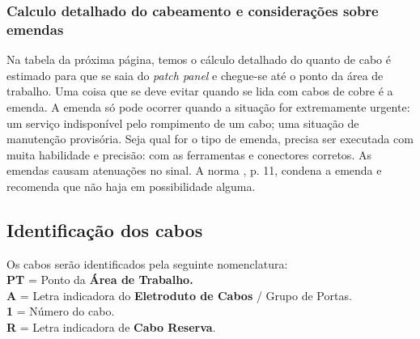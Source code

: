 \documentclass[	DIV=calc,%
							paper=a4,%
							fontsize=12pt,%
							onecolumn]{scrartcl}	 					%
\begin{document}




\subsubsection{Calculo detalhado do cabeamento e considerações sobre emendas}

Na tabela da próxima página, temos o cálculo detalhado do quanto de cabo é estimado para que se saia do \textit{patch panel} e chegue-se até o ponto da área de trabalho. Uma coisa que se deve evitar quando se lida com cabos de cobre é a emenda. A emenda só pode ocorrer quando a situação for extremamente urgente: um serviço indisponível pelo rompimento de um cabo; uma situação de manutenção provisória. Seja qual for o tipo de emenda, precisa ser executada com muita habilidade e precisão: com as ferramentas e conectores corretos. As emendas causam atenuações no sinal. A norma \cite{abnt14565}, p. 11, condena a emenda e recomenda que não haja em possibilidade alguma.




\clearpage
\thispagestyle{empty}
\recalctypearea

{\centering

}

\clearpage
{}
\recalctypearea

\subsection{Identificação dos cabos}

Os cabos serão identificados pela seguinte nomenclatura:
\\

\textbf{PT} = Ponto da \textbf{Área de Trabalho.}
\\

\textbf{A} = Letra indicadora do \textbf{Eletroduto de Cabos} / Grupo de Portas.
\\

\textbf{1} = Número do cabo.
\\

\textbf{R} = Letra indicadora de \textbf{Cabo Reserva}.
\\
\end{document}
